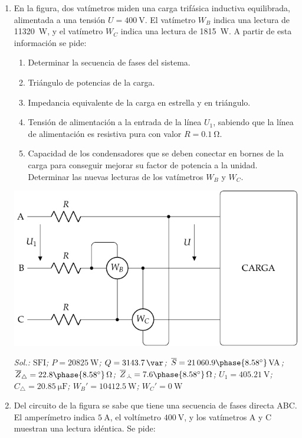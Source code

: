 \begin{enumerate}
  
\item En la figura, dos vatímetros miden una carga trifásica inductiva
  equilibrada, alimentada a una tensión $U = \SI{400}{\volt}$. El
  vatímetro $W_B$ indica una lectura de \SI{11320}{\watt}, y el
  vatímetro $W_C$ indica una lectura de \SI{1815}{\watt}. A partir de
  esta información se pide:

  \begin{enumerate}
  \item Determinar la secuencia de fases del sistema.
  \item Triángulo de potencias de la carga.
  \item Impedancia equivalente de la carga en estrella y en triángulo.
  \item Tensión de alimentación a la entrada de la línea $U_1$,
    sabiendo que la línea de alimentación es resistiva pura con valor
    $R = \SI{0.1}{\ohm}$.
  \item Capacidad de los condensadores que se deben conectar en bornes
    de la carga para conseguir mejorar su factor de potencia a la
    unidad. Determinar las nuevas lecturas de los vatímetros $W_B$ y
    $W_C$.
  \end{enumerate}

\begin{center}
  \includegraphics[width=0.64\linewidth]{../figs//BT3_10.pdf}
\end{center}

\emph{Sol.:\; $\mathrm{SFI}$;\; $ P = \qty{20825}{\watt}$;\;
  $Q = \qty{3143.7}{\var}$;\;
  $\overline{S} = 21\,060.9\phase{\ang{8.58}}\,\unit{VA}$;\;
  $\overline{Z}_{\triangle} = {22.8\phase{\ang{8.58}}}\,\unit{\ohm}$;\;
  $\overline{Z}_{\wye} = {7.6\phase{\ang{8.58}}}\,\unit{\ohm}$;\;
  $U_1 = \SI{405.21}{\volt}$;\; $C_{\triangle} = \SI{20.85}{\micro\farad}$;\;
  $W_B'=\qty{10412.5}{\watt}$;\;
  $W_C'=\qty{0}{\watt}$ }

\item Del circuito de la figura se sabe que tiene una secuencia de
  fases directa ABC. El amperímetro indica $\SI{5}{\ampere}$, el
  voltímetro $\SI{400}{\volt}$, y los vatímetros A y C muestran una
  lectura idéntica. Se pide:


\end{enumerate}
